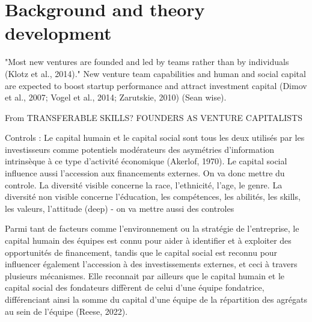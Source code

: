 \documentclass[11pt]{article}
\begin{document}
\section{Background and theory development}

"Most new ventures are founded and led by teams rather than by individuals (Klotz et al., 2014)." New venture team capabilities and human and social capital are expected to boost startup performance and attract investment capital (Dimov et al., 2007; Vogel et al., 2014; Zarutskie, 2010) (Sean wise).





















From TRANSFERABLE SKILLS? FOUNDERS AS VENTURE CAPITALISTS







Controls : Le capital humain et le capital social sont tous les deux utilisés par les investisseurs comme potentiels modérateurs des asymétries d'information intrinsèque à ce type d'activité économique (Akerlof, 1970). Le capital social influence aussi l'accession aux financements externes. On va donc mettre du controle. La diversité visible concerne la race, l'ethnicité, l'age, le genre. La diversité non visible concerne l'éducation, les compétences, les abilités, les skills, les valeurs, l'attitude (deep) - on va mettre aussi des controles


Parmi tant de facteurs comme l'environnement ou la stratégie de l'entreprise, le capital humain des équipes est connu pour aider à identifier et à exploiter des opportunités de financement, tandis que le capital social est reconnu pour influencer également l'accession à des investissements externes, et ceci à travers plusieurs mécanismes. Elle reconnait par ailleurs que le capital humain et le capital social des fondateurs diffèrent de celui d'une équipe fondatrice, différenciant ainsi la somme du capital d'une équipe de la répartition des agrégats au sein de l'équipe (Reese, 2022).
\end{document}
